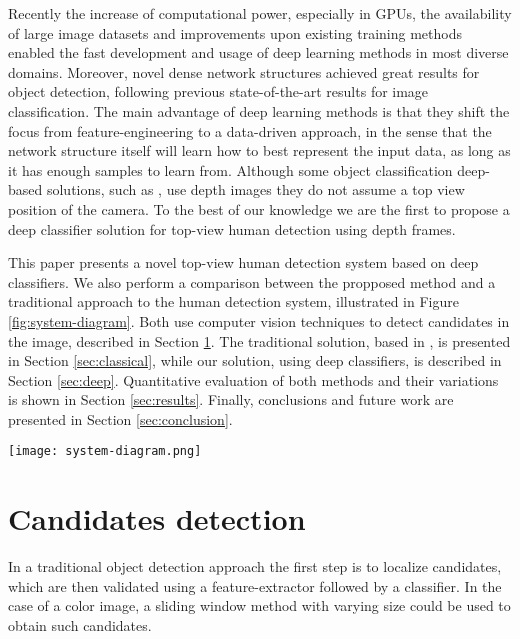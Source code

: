   Recently the increase of computational power, especially in GPUs, the availability of large image datasets and improvements upon existing training methods \cite{nair2010relu} enabled the fast development and usage of deep learning methods in most diverse domains. Moreover, novel dense network structures \cite{NIPS2013_5207} achieved great results for object detection, following previous state-of-the-art results \cite{hintonCONVNET} for image classification. The main advantage of deep learning methods is that they shift the focus from feature-engineering to a data-driven approach, in the sense that the network structure itself will learn how to best represent the input data, as long as it has enough samples to learn from. Although some object classification deep-based solutions, such as \cite{thornberg2015combining}, use depth images they do not assume a top view position of the camera. To the best of our knowledge we are the first to propose a deep classifier solution for top-view human detection using depth frames.

  This paper presents a novel top-view human detection system based on deep classifiers. We also perform a comparison between the propposed method and a traditional approach to the human detection system, illustrated in Figure \ref{fig:system-diagram}. Both use computer vision techniques to detect candidates in the image, described in Section \ref{sec:candidates}. The traditional solution, based in \cite{rauter}, is presented in Section \ref{sec:classical}, while our solution, using deep classifiers, is described in Section \ref{sec:deep}. Quantitative evaluation of both methods and their variations is shown in Section \ref{sec:results}. Finally, conclusions and future work are presented in Section \ref{sec:conclusion}.

  \begin{figure*}[!t]
  \centering
  \texttt{[image: system-diagram.png]}
  \caption{Human detection system diagram.}
  \label{fig:system-diagram}
  \end{figure*}

\section{Candidates detection}
\label{sec:candidates}

    In a traditional object detection approach \cite{traditional-objdetect} the first step is to localize candidates, which are then validated using a feature-extractor followed by a classifier. In the case of a color image, a sliding window method with varying size could be used to obtain such candidates.

